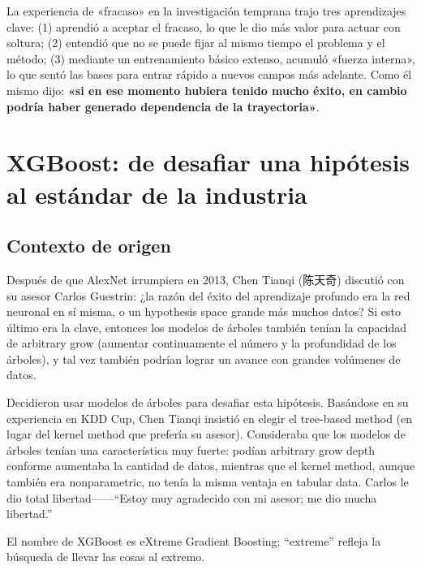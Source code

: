\documentclass[a4paper]{article}
\begin{document}
La experiencia de «fracaso» en la investigación temprana trajo tres aprendizajes clave: (1) aprendió a aceptar el fracaso, lo que le dio más valor para actuar con soltura; (2) entendió que no se puede fijar al mismo tiempo el problema y el método; (3) mediante un entrenamiento básico extenso, acumuló «fuerza interna», lo que sentó las bases para entrar rápido a nuevos campos más adelante. Como él mismo dijo: \textbf{«si en ese momento hubiera tenido mucho éxito, en cambio podría haber generado dependencia de la trayectoria»}.
\section{XGBoost: de desafiar una hipótesis al estándar de la industria}

\subsection{Contexto de origen}

Después de que AlexNet irrumpiera en 2013, Chen Tianqi (陈天奇) discutió con su asesor Carlos Guestrin: ¿la razón del éxito del aprendizaje profundo era la red neuronal en sí misma, o un hypothesis space grande más muchos datos? Si esto último era la clave, entonces los modelos de árboles también tenían la capacidad de arbitrary grow (aumentar continuamente el número y la profundidad de los árboles), y tal vez también podrían lograr un avance con grandes volúmenes de datos.

Decidieron usar modelos de árboles para desafiar esta hipótesis. Basándose en su experiencia en KDD Cup, Chen Tianqi insistió en elegir el tree-based method (en lugar del kernel method que prefería su asesor). Consideraba que los modelos de árboles tenían una característica muy fuerte: podían arbitrary grow depth conforme aumentaba la cantidad de datos, mientras que el kernel method, aunque también era nonparametric, no tenía la misma ventaja en tabular data. Carlos le dio total libertad------``Estoy muy agradecido con mi asesor; me dio mucha libertad.''

El nombre de XGBoost es eXtreme Gradient Boosting; ``extreme'' refleja la búsqueda de llevar las cosas al extremo.
\end{document}
